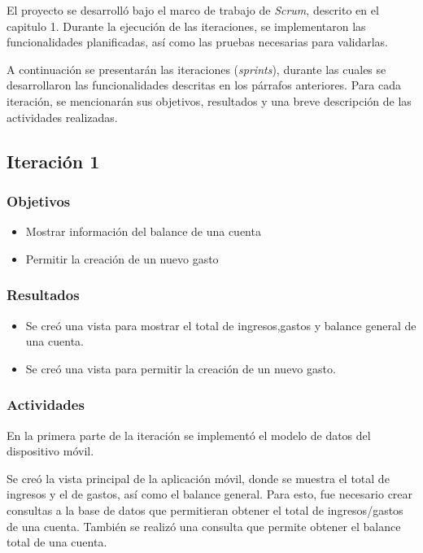 El proyecto se desarrolló bajo el marco de trabajo de \textit{Scrum}, descrito en el capitulo 1. Durante la ejecución de las iteraciones, se implementaron las funcionalidades planificadas, así como las pruebas necesarias para validarlas.

A continuación se presentarán las iteraciones (\textit{sprints}), durante las cuales se desarrollaron las funcionalidades descritas en los párrafos anteriores. Para cada iteración, se mencionarán sus objetivos, resultados y una breve descripción de las actividades realizadas.

\subsection{Iteración 1}

\subsubsection{Objetivos}
	\begin{itemize}
	\item Mostrar información del balance de una cuenta
	\item Permitir la creación de un nuevo gasto
	\end{itemize}

\subsubsection{Resultados}
\begin{itemize}
\item Se creó una vista para mostrar el total de ingresos,gastos y balance general de una cuenta.
\item Se creó una vista para permitir la creación de un nuevo gasto.
\end{itemize}

\subsubsection{Actividades}
En la primera parte de la iteración se implementó el modelo de datos del dispositivo móvil.

Se creó la vista principal de la aplicación móvil, donde se muestra el total de ingresos y el de gastos, así como el balance general. Para esto, fue necesario crear consultas a la base de datos que permitieran obtener el total de ingresos/gastos de una cuenta.  También se realizó una consulta que permite obtener el balance total de una cuenta.

